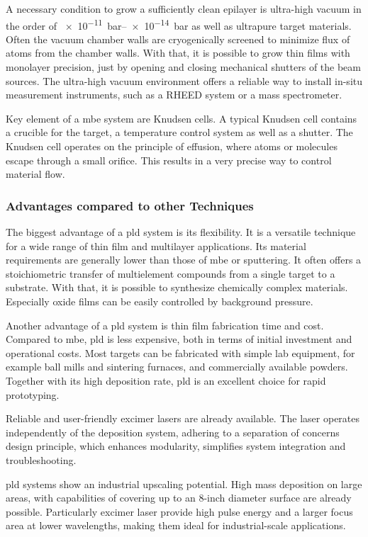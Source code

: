 A necessary condition to grow a sufficiently clean epilayer is ultra-high vacuum in the
order of \qtyrange{e-11}{e-14}{\bar} as well as ultrapure target materials.
Often the vacuum chamber walls are cryogenically screened to minimize flux of 
atoms from the chamber walls.
With that, it is possible to grow thin films with monolayer precision, just by opening 
and closing mechanical shutters of the beam sources. 
The ultra-high vacuum environment offers a reliable way to install in-situ measurement
instruments, such as a RHEED system or a mass spectrometer. 

Key element of a \ac{mbe} system are Knudsen cells. 
A typical Knudsen cell contains a crucible for the target, a temperature control system 
as well as a shutter. 
The Knudsen cell operates on the principle of effusion, where atoms or molecules escape 
through a small orifice. 
This results in a very precise way to control material flow. 

\subsubsection{Advantages compared to other Techniques}
The biggest advantage of a \ac{pld} system is its flexibility. 
It is a versatile technique for a wide range of thin film and multilayer applications.
Its material requirements are generally lower than those of \ac{mbe} or sputtering.
It often offers a stoichiometric transfer of multielement compounds from a single 
target to a substrate.
With that, it is possible to synthesize chemically complex materials. 
Especially oxide films can be easily controlled by background pressure. 

Another advantage of a \ac{pld} system is thin film fabrication time and cost. 
Compared to \ac{mbe}, \ac{pld} is less expensive, both in terms of initial investment 
and operational costs.
Most targets can be fabricated with simple lab equipment, for example ball mills and 
sintering furnaces, and commercially available powders.
Together with its high deposition rate, \ac{pld} is an excellent choice for
rapid prototyping.    

Reliable and user-friendly excimer lasers are already available. 
The laser operates independently of the deposition system, adhering to a separation 
of concerns design principle, which enhances modularity, simplifies system 
integration and troubleshooting.

\ac{pld} systems show an industrial upscaling potential. 
High mass deposition on large areas, with capabilities of covering up to an 8-inch 
diameter surface are already possible. 
Particularly excimer laser provide high pulse energy and a larger focus area at 
lower wavelengths, making them ideal for industrial-scale applications.


